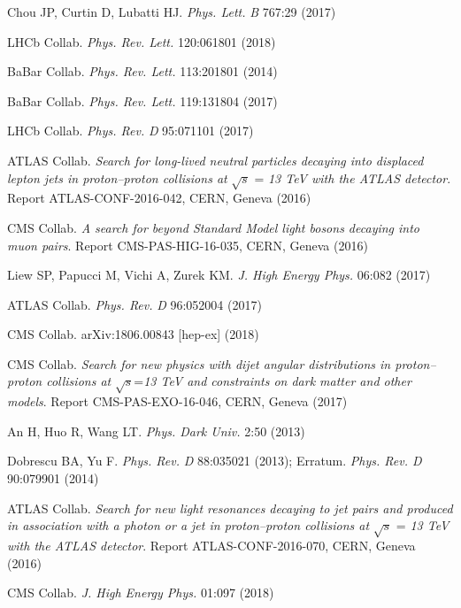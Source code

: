 \documentclass{ar-1col}
\begin{document}
{\begin{thebibliography}{175}
Chou JP, Curtin D, Lubatti HJ. \textit{Phys. Lett.} \textit{B} 767:29 (2017)

{LHCb Collab}.  \textit{Phys. Rev. Lett.} 120:061801 (2018)


BaBar Collab. \textit{Phys. Rev. Lett.} 113:201801 (2014)

BaBar Collab. \textit{Phys. Rev. Lett.} 119:131804 (2017)

{LHCb Collab}. \textit{Phys. Rev.} \textit{D} 95:071101 (2017)

ATLAS Collab. \textit{Search for long-lived neutral particles decaying into displaced lepton jets in proton--proton collisions at} $\sqrt{s}$ = \textit{13 TeV with the ATLAS detector}. Report ATLAS-CONF-2016-042, CERN, Geneva (2016)

CMS Collab. \textit{A search for beyond Standard Model light bosons decaying into muon pairs}.
Report CMS-PAS-HIG-16-035, CERN, Geneva (2016)

Liew SP, Papucci M, Vichi A, Zurek KM. \textit{J. High Energy Phys.} 06:082 (2017)

{ATLAS Collab}. \textit{Phys. Rev.} \textit{D} 96:052004 (2017)
  
{CMS Collab.} arXiv:1806.00843 [hep-ex] (2018) 

CMS Collab.\textit{ Search for new physics with dijet angular distributions in proton--proton collisions at} $\sqrt{s}$=\textit{13 TeV and constraints on dark matter and other models}. Report CMS-PAS-EXO-16-046, CERN, Geneva (2017)

An H, Huo R, Wang LT. \textit{Phys. Dark Univ.} 2:50 (2013)

Dobrescu BA, Yu F. \textit{Phys. Rev.} \textit{D} 88:035021 (2013); Erratum. \textit{Phys. Rev. D} 90:079901 (2014)

{ATLAS Collab}. \textit{Search for new light resonances decaying to jet pairs and produced in association with a photon or a jet in proton--proton collisions at}
$\sqrt{s}$ = \textit{13 TeV with the ATLAS detector}. Report ATLAS-CONF-2016-070, CERN, Geneva (2016)

{CMS Collab}. \textit{J. High Energy Phys.} 01:097 (2018) 


\end{thebibliography}}
\end{document}
